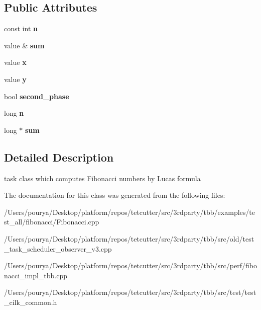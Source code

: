 \subsection*{Public Attributes}
\begin{DoxyCompactItemize}
\item 
\hypertarget{structFibTask_aae95f5d1a71b3ba8f7416e9f3013dc8e}{}const int {\bfseries n}\label{structFibTask_aae95f5d1a71b3ba8f7416e9f3013dc8e}

\item 
\hypertarget{structFibTask_a6361cecc880778dba8f072345006b7a4}{}value \& {\bfseries sum}\label{structFibTask_a6361cecc880778dba8f072345006b7a4}

\item 
\hypertarget{structFibTask_a8bb077d6150c36cf25ebc53826311c29}{}value {\bfseries x}\label{structFibTask_a8bb077d6150c36cf25ebc53826311c29}

\item 
\hypertarget{structFibTask_ae316a1e2a54bad3d1d1d79478fbf84ff}{}value {\bfseries y}\label{structFibTask_ae316a1e2a54bad3d1d1d79478fbf84ff}

\item 
\hypertarget{structFibTask_aa8bd60519c02edb58291e75eaae0fe22}{}bool {\bfseries second\+\_\+phase}\label{structFibTask_aa8bd60519c02edb58291e75eaae0fe22}

\item 
\hypertarget{structFibTask_a17db3ed86bb8f14fd0e86c87701aa4fc}{}long {\bfseries n}\label{structFibTask_a17db3ed86bb8f14fd0e86c87701aa4fc}

\item 
\hypertarget{structFibTask_a025a23adbb23364a9a13db01a9df2448}{}long $\ast$ {\bfseries sum}\label{structFibTask_a025a23adbb23364a9a13db01a9df2448}

\end{DoxyCompactItemize}


\subsection{Detailed Description}
task class which computes Fibonacci numbers by Lucas formula 

The documentation for this class was generated from the following files\+:\begin{DoxyCompactItemize}
\item 
/\+Users/pourya/\+Desktop/platform/repos/tetcutter/src/3rdparty/tbb/examples/test\+\_\+all/fibonacci/Fibonacci.\+cpp\item 
/\+Users/pourya/\+Desktop/platform/repos/tetcutter/src/3rdparty/tbb/src/old/test\+\_\+task\+\_\+scheduler\+\_\+observer\+\_\+v3.\+cpp\item 
/\+Users/pourya/\+Desktop/platform/repos/tetcutter/src/3rdparty/tbb/src/perf/fibonacci\+\_\+impl\+\_\+tbb.\+cpp\item 
/\+Users/pourya/\+Desktop/platform/repos/tetcutter/src/3rdparty/tbb/src/test/test\+\_\+cilk\+\_\+common.\+h\end{DoxyCompactItemize}
